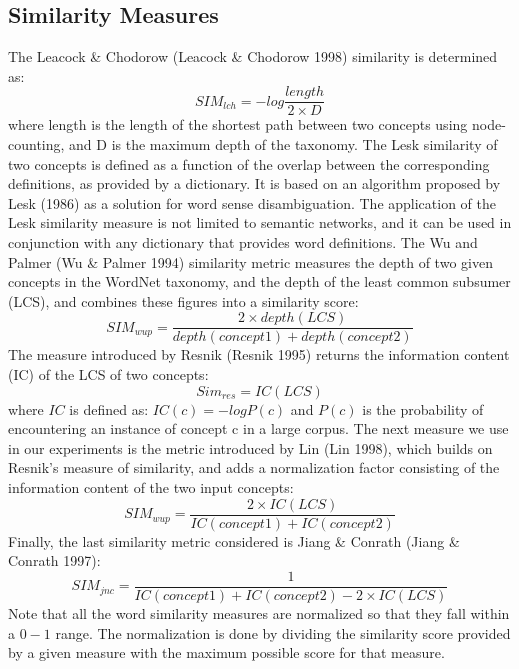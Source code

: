 \subsection{Similarity Measures}
\label {SimilarityMeasures}
\label{measuresSection}
The Leacock \& Chodorow (Leacock \& Chodorow 1998) similarity is determined as:
\begin{equation}
SIM_{lch} = -log \frac{length}{2 \times D}
\end{equation}
where length is the length of the shortest path between two concepts using node-counting, and D is the maximum depth of the taxonomy.
The Lesk similarity of two concepts is defined as a function of the overlap between the corresponding definitions, as provided by a dictionary. It is based on an algorithm proposed by Lesk (1986) as a solution for word sense disambiguation.
The application of the Lesk similarity measure is not limited to semantic networks, and it can be used in conjunction with any dictionary that provides word definitions.
The Wu and Palmer (Wu \& Palmer 1994) similarity metric measures the depth of two given concepts in the WordNet taxonomy, and the depth of the least common subsumer (LCS), and combines these figures into a similarity score:
\begin{equation}
SIM_{wup} =\frac{2\times depth(LCS)}{depth(concept1) + depth(concept2)}
\end{equation}
The measure introduced by Resnik (Resnik 1995) returns the information content (IC) of the LCS of two concepts:
\begin{equation}
Sim_{res} = IC(LCS)
\end{equation}
where $IC$ is defined as:
$IC(c) = -log P(c)$ and $P(c)$ is the probability of encountering an instance of concept c in a large corpus.
The next measure we use in our experiments is the metric introduced by Lin (Lin 1998), which builds on Resnik’s measure of similarity, and adds a normalization factor consisting of the information content of the two input concepts:
\begin{equation}
SIM_{wup} =\frac{2\times IC(LCS)}{IC(concept1) + IC(concept2)}
\end{equation}
Finally, the last similarity metric considered is Jiang \& Conrath (Jiang \& Conrath 1997):
\begin{equation}
SIM_{jnc} =\frac{1}{IC(concept1) + IC(concept2) - 2\times IC(LCS)}
\end{equation}
Note that all the word similarity measures are normalized so that they fall within a $0-$$1$ range. The normalization is done by dividing the similarity score provided by a given measure with the maximum possible score for that measure. 

